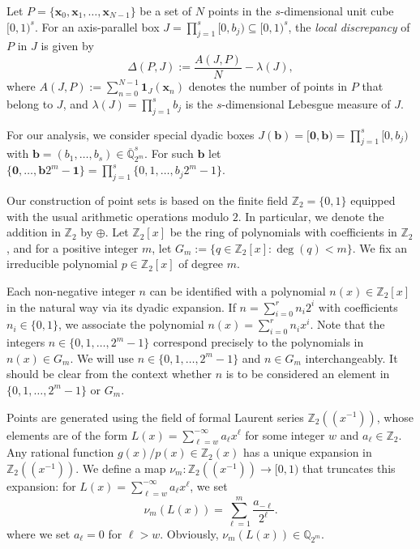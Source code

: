\documentclass[12pt]{article}
\theoremstyle{definition}
\numberwithin{equation}{section}
\begin{document}
\medskip

Let $P = \{\bm{x}_0, \bm{x}_1, \ldots, \bm{x}_{N-1} \}$ be a set of $N$ points in the $s$-dimensional unit cube $[0,1)^s$. For an axis-parallel box $J = \prod_{j=1}^s [0, b_j) \subseteq [0,1)^s$, the \textit{local discrepancy} of $P$ in $J$ is given by
\begin{equation}\label{def_Delta}
\Delta(P, J) := \frac{A(J,P)}{N} - \lambda(J),
\end{equation}
where $A(J,P):=\sum_{n=0}^{N-1}\mathbf{1}_J(\bm{x}_n)$ denotes the number of points in $P$ that belong to $J$, and $\lambda(J) = \prod_{j=1}^s b_j$ is the $s$-dimensional Lebesgue measure of $J$.

For our analysis, we consider special dyadic boxes $J(\bm{b}) = [\bm{0}, \bm{b}) = \prod_{j=1}^s [0, b_j)$ with $\bm{b} =(b_1, \ldots, b_s) \in \overline{\mathbb{Q}}_{2^m}^s$. For such $\bm{b}$ let $\{\bm{0}, \ldots, \bm{b} 2^m - \bm{1}\} = \prod_{j=1}^s \{0, 1, \ldots, b_j 2^m-1\}$. 


\bigskip

Our construction of point sets is based on the finite field $\mathbb{Z}_2 = \{0, 1\}$ equipped with the usual arithmetic operations modulo $2$. In particular, we denote the addition in $\mathbb{Z}_2$ by $\oplus$. Let $\mathbb{Z}_2[x]$ be the ring of polynomials with coefficients in $\mathbb{Z}_2$, and for a positive integer $m$, let $G_m := \{ q \in \mathbb{Z}_2[x] : \deg(q) < m \}$. We fix an irreducible polynomial $p \in \mathbb{Z}_2[x]$ of degree $m$.

Each non-negative integer $n$ can be identified with a polynomial $n(x) \in \mathbb{Z}_2[x]$ in the natural way via its dyadic expansion. If $n = \sum_{i=0}^r n_i 2^i$ with coefficients $n_i \in \{0,1\}$, we associate the polynomial $n(x) = \sum_{i=0}^r n_i x^i$. Note that the integers $n \in \{0, 1, \ldots, 2^m-1\}$ correspond precisely to the polynomials in $n(x) \in G_m$. We will use $n \in \{0, 1, \ldots, 2^m-1\}$ and $n \in G_m$ interchangeably. It should be clear from the context whether $n$ is to be considered an element in $\{0, 1,\ldots, 2^m-1\}$ or $G_m$.



Points are generated using the field of formal Laurent series $\mathbb{Z}_2((x^{-1}))$, whose elements are of the form $L(x) = \sum_{\ell=w}^{-\infty} a_\ell x^\ell$ for some integer $w$ and $a_\ell \in \mathbb{Z}_2$. Any rational function $g(x)/p(x) \in \mathbb{Z}_2(x)$ has a unique expansion in $\mathbb{Z}_2((x^{-1}))$. We define a map $\nu_m: \mathbb{Z}_2((x^{-1})) \to [0,1)$ that truncates this expansion: for $L(x) = \sum_{\ell=w}^{-\infty} a_\ell x^\ell$, we set
\[
\nu_m(L(x)) = \sum_{\ell=1}^{m} \frac{a_{-\ell}}{2^\ell}.
\]
where we set $a_{\ell} = 0$ for $\ell > w$. Obviously, $\nu_m(L(x))  \in \mathbb{Q}_{2^m}$.
\end{document}
